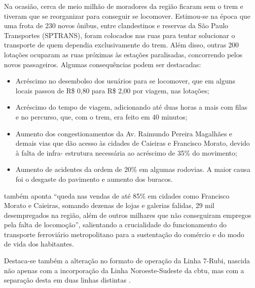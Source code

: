     \begin{citacao}
    	Na ocasião, cerca de meio milhão de moradores da região ficaram sem o trem e tiveram que se reorganizar para conseguir se locomover. Estimou-se na época que uma frota de 230 novos ônibus, entre clandestinos e reservas da São Paulo Transportes (SPTRANS), foram colocados nas ruas para tentar solucionar o transporte de quem dependia exclusivamente do trem. Além disso, outras 200 lotações ocuparam as ruas próximas às estações paralisadas, concorrendo pelos novos passageiros. Algumas consequências podem ser destacadas:
    	
    	\begin{itemize}[leftmargin=\leftskip+-]
    		\item Acréscimo no desembolso dos usuários para se locomover, que em alguns locais
    	passou de R\$ 0,80 para R\$ 2,00 por viagem, nas lotações;
	    	\item Acréscimo do tempo de viagem, adicionando até duas horas a mais com filas e no
    	percurso, que, com o trem, era feito em 40 minutos;
	    	\item Aumento dos congestionamentos da Av. Raimundo Pereira Magalhães e demais vias
    	que dão acesso às cidades de Caieiras e Francisco Morato, devido à falta de infra-
    	estrutura necessária ao acréscimo de 35\% do movimento;
		    \item Aumento de acidentes da ordem de 20\% em algumas rodovias. A maior causa foi o
    	desgaste do pavimento e aumento dos buracos.
		\end{itemize}
    \end{citacao}
    
     também aponta ``queda nas vendas de até 85\% em cidades como Francisco Morato e Caieiras, somando dezenas de lojas e galerias falidas, 29 mil desempregados na região, além de outros milhares que não conseguiram empregos pela falta de locomoção'', salientando a crucialidade do funcionamento do transporte ferroviário metropolitano para a sustentação do comércio e do modo de vida dos habitantes.
    
    Destaca-se também a alteração no formato de operação da Linha 7-Rubi, nascida não apenas com a incorporação da Linha Noroeste-Sudeste da \gls{cbtu}, mas com a separação desta em duas linhas distintas \cite[p.50]{ferreira2010a} \cite[p.223]{stefani2007a}.
    
%
%

